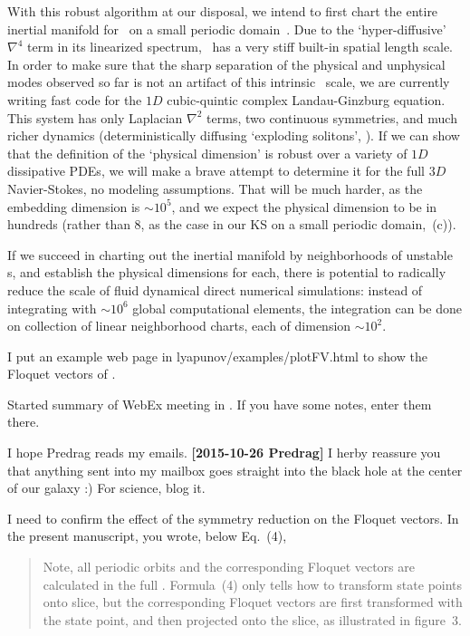\begin{description}
With this robust algorithm at our disposal, we intend to first chart the
entire inertial manifold for \KS\ on a small periodic
domain~. Due to the `hyper-diffusive' $\nabla^4$ term in its
linearized spectrum, \KS\ has a very stiff built-in spatial length scale.
In order to make sure that the sharp separation of the physical and
unphysical modes observed so far is not an artifact of this intrinsic
\KS\ scale, we are currently writing fast code for the $1D$ cubic-quintic
complex Landau-Ginzburg equation. This system has only Laplacian
$\nabla^2$ terms, two continuous symmetries, and much richer dynamics
(deterministically diffusing `exploding solitons', \etc). If
we can show that the {\cLvs} definition of the `physical dimension' is
robust over a variety of $1D$ dissipative PDEs, we will make a brave
attempt to determine it for the full $3D$ Navier-Stokes, no modeling
assumptions. That will be much harder, as the embedding dimension is
$\sim 10^5$, and we expect the physical dimension to be in hundreds
(rather than 8, as the case in our KS on a small periodic domain,
\,(c)).

If we succeed in charting out the inertial manifold by neighborhoods of
unstable \po s, and establish the physical dimensions for each, there is
potential to radically reduce the scale of fluid dynamical direct
numerical simulations: instead of integrating with $\sim 10^{6}$ global
computational elements, the integration can be done on collection of
linear neighborhood charts, each of dimension $\sim 10^{2}$.


\item[2015-05-12 Xiong] I put an example web page in
lyapunov/examples/plotFV.html
to show the Floquet vectors of .

\item[2015-10-15 Predrag]
Started summary of WebEx meeting in . If you have some notes,
enter them there.

\item[2015-10-25 Kazumasa]
I hope Predrag reads my emails.
{\bf [2015-10-26 Predrag]} I herby reassure you that anything sent into
my mailbox goes straight into the black hole at the center of our galaxy :)
For science, blog it.

I need to confirm the effect of the symmetry reduction on the
Floquet vectors. In the present manuscript, you wrote, below Eq.~(4),
\begin{quote}
Note, all periodic orbits and the corresponding Floquet vectors are
calculated in the full \statesp. Formula~(4) only tells how to
transform state points onto slice, but the corresponding Floquet vectors
are first transformed with the state point, and then projected onto the
slice, as illustrated in figure~3.
\end{quote}


\end{description}
